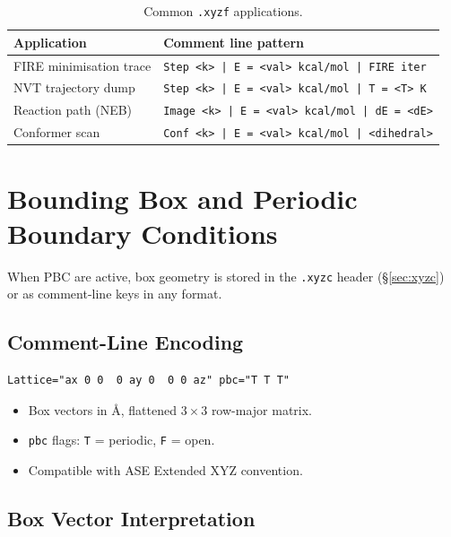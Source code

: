 \documentclass[12pt, a4paper, oneside]{article}
\begin{document}
\begin{table}[htbp]
  \centering
  \caption{Common \texttt{.xyzf} applications.}
  \label{tab:xyzf_uses}
  \begin{tabular}{lp{8cm}}
    \toprule
    Application & Comment line pattern \\
    \midrule
    FIRE minimisation trace  & \texttt{Step <k> | E = <val> kcal/mol | FIRE iter} \\
    NVT trajectory dump      & \texttt{Step <k> | E = <val> kcal/mol | T = <T> K} \\
    Reaction path (NEB)      & \texttt{Image <k> | E = <val> kcal/mol | dE = <dE>} \\
    Conformer scan           & \texttt{Conf <k> | E = <val> kcal/mol | <dihedral>} \\
    \bottomrule
  \end{tabular}
\end{table}

\section{Bounding Box and Periodic Boundary Conditions}
\label{sec:pbc}

When PBC are active, box geometry is stored in the \texttt{.xyzc} header
(\S\ref{sec:xyzc}) or as comment-line keys in any format.

\subsection{Comment-Line Encoding}

\begin{lstlisting}[language={},frame=single]
Lattice="ax 0 0  0 ay 0  0 0 az" pbc="T T T"
\end{lstlisting}

\begin{itemize}
  \item Box vectors in \AA, flattened $3\times 3$ row-major matrix.
  \item \texttt{pbc} flags: \texttt{T} = periodic, \texttt{F} = open.
  \item Compatible with ASE Extended XYZ convention.
\end{itemize}

\subsection{Box Vector Interpretation}
\end{document}
